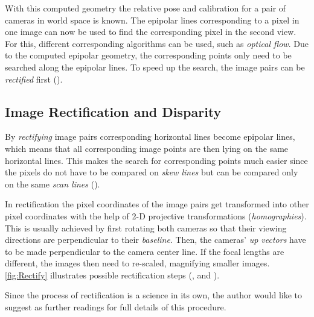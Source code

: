 With this computed geometry the relative pose and calibration for a pair of cameras in world space is known. The epipolar lines corresponding to a pixel in one image can now be used to find the corresponding pixel in the second view. For this, different corresponding algorithms can be used, such as \textit{optical flow}. Due to the computed epipolar geometry, the corresponding points only need to be searched along the epipolar lines. To speed up the search, the image pairs can be \textit{rectified} first (\cite[p.472 et seq.]{Szeliski.2011}).

\subsection{Image Rectification and Disparity}\label{ssec:RectificationDisp}
By \textit{rectifying} image pairs corresponding horizontal lines become epipolar lines, which means that all corresponding image points are then lying on the same horizontal lines. This makes the search for corresponding points much easier since the pixels do not have to be compared on \textit{skew lines} but can be compared only on the same \textit{scan lines} (\cite[p.1]{Loop.2001}).


In rectification the pixel coordinates of the image pairs get transformed into other pixel coordinates with the help of 2-D projective transformations (\textit{homographies}). This is usually achieved by first rotating both cameras so that their viewing directions are perpendicular to their \textit{baseline}. Then, the cameras' \textit{up vectors} have to be made perpendicular to the camera center line. If the focal lengths are different, the images then need to re-scaled, magnifying smaller images. \autoref{fig:Rectify} illustrates possible rectification steps (\cite[p.1]{Loop.2001}, \cite[p.473]{Szeliski.2011} and \cite[p.436]{Luhmann.2014}).

Since the process of rectification is a science in its own, the author would like to suggest \cite{Loop.2001} as further readings for full details of this procedure.


